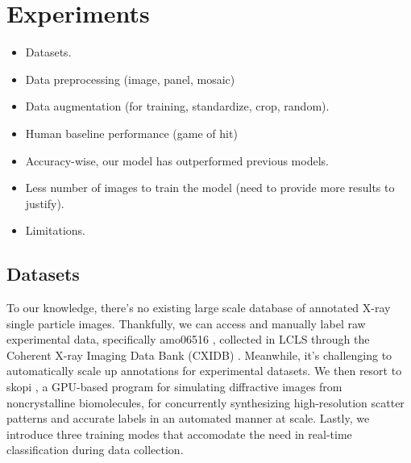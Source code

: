 \section{Experiments}

{
\color{gray} 

\begin{itemize}

    \item Datasets.

    \item Data preprocessing (image, panel, mosaic)

    \item Data augmentation (for training, standardize, crop, random).

    \item Human baseline performance (game of hit)

    \item Accuracy-wise, our model has outperformed previous models.  

    \item Less number of images to train the model (need to provide more results
    to justify).  

    \item Limitations.

\end{itemize}

}


\subsection{Datasets}


To our knowledge, there's no existing large scale database of annotated X-ray
single particle images.  Thankfully, we can access and manually label raw
experimental data, specifically amo06516 \cite{liDiffractionDataAerosolized2020},
collected in LCLS through the Coherent X-ray Imaging Data Bank (CXIDB)
\cite{maiaCoherentXrayImaging2012}.  Meanwhile, it's challenging to
automatically scale up annotations for experimental datasets.  We then resort to
skopi \cite{peckSkopiSimulationPackage2021}, a GPU-based program for simulating
diffractive images from noncrystalline biomolecules, for concurrently
synthesizing high-resolution scatter patterns and accurate labels in an
automated manner at scale.  Lastly, we introduce three training modes that
accomodate the need in real-time classification during data collection.  

